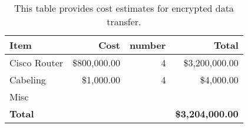\tiny \begin{longtable} {|l|r|r|r|} \caption{This table provides cost estimates for encrypted data transfer. \label{tab:ipsec}}\\ 
\hline 
\textbf{Item}&\textbf{Cost}&\textbf{number}&\textbf{Total} \\ \hline
{Cisco Router }&{\$800,000.00}&{4}&{\$3,200,000.00} \\ \hline
{Cabeling}&{\$1,000.00}&{4}&{\$4,000.00} \\ \hline
{Misc}&&& \\ \hline
\textbf{Total}&\textbf{}&\textbf{}&\textbf{\$3,204,000.00} \\ \hline
\end{longtable} \normalsize
